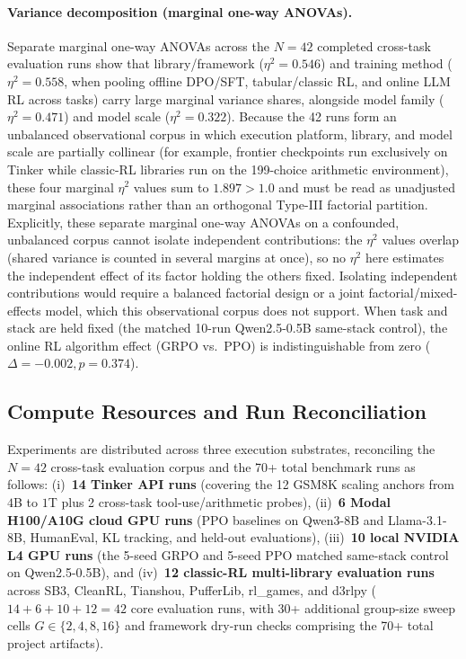 \paragraph{Variance decomposition (marginal one-way ANOVAs).}
Separate marginal one-way ANOVAs across the $N=42$ completed cross-task evaluation runs show
that library/framework ($\eta^2 = 0.546$) and training method ($\eta^2 = 0.558$, when pooling offline DPO/SFT, tabular/classic RL, and online LLM RL across tasks)
carry large marginal variance shares, alongside model
family ($\eta^2 = 0.471$) and model scale ($\eta^2 = 0.322$). Because the 42 runs form an unbalanced observational corpus in which execution platform, library, and model scale are partially collinear (for example, frontier checkpoints run exclusively on Tinker while classic-RL libraries run on the 199-choice arithmetic environment), these four marginal $\eta^2$ values sum to $1.897 > 1.0$ and must be read as unadjusted marginal associations rather than an orthogonal Type-III factorial partition.
Explicitly, these separate marginal one-way ANOVAs on a confounded, unbalanced corpus cannot isolate independent contributions: the $\eta^2$ values overlap (shared variance is counted in several margins at once), so no $\eta^2$ here estimates the independent effect of its factor holding the others fixed.
Isolating independent contributions would require a balanced factorial design or a joint factorial/mixed-effects model, which this observational corpus does not support.
When task and stack are held fixed (the matched 10-run Qwen2.5-0.5B same-stack control), the online RL algorithm effect (GRPO vs.\ PPO) is indistinguishable from zero ($\Delta = -0.002, p = 0.374$).

\subsection{Compute Resources and Run Reconciliation}

Experiments are distributed across three execution substrates, reconciling the $N=42$ cross-task evaluation corpus and the 70+ total benchmark runs as follows: (i)~\textbf{14 Tinker API runs} (covering the 12 GSM8K scaling anchors from $4$B to $1$T plus 2 cross-task tool-use/arithmetic probes), (ii)~\textbf{6 Modal H100/A10G cloud GPU runs} (PPO baselines on Qwen3-8B and Llama-3.1-8B, HumanEval, KL tracking, and held-out evaluations), (iii)~\textbf{10 local NVIDIA L4 GPU runs} (the 5-seed GRPO and 5-seed PPO matched same-stack control on Qwen2.5-0.5B), and (iv)~\textbf{12 classic-RL multi-library evaluation runs} across SB3, CleanRL, Tianshou, PufferLib, rl\_games, and d3rlpy ($14 + 6 + 10 + 12 = 42$ core evaluation runs, with 30+ additional group-size sweep cells $G \in \{2, 4, 8, 16\}$ and framework dry-run checks comprising the 70+ total project artifacts).

